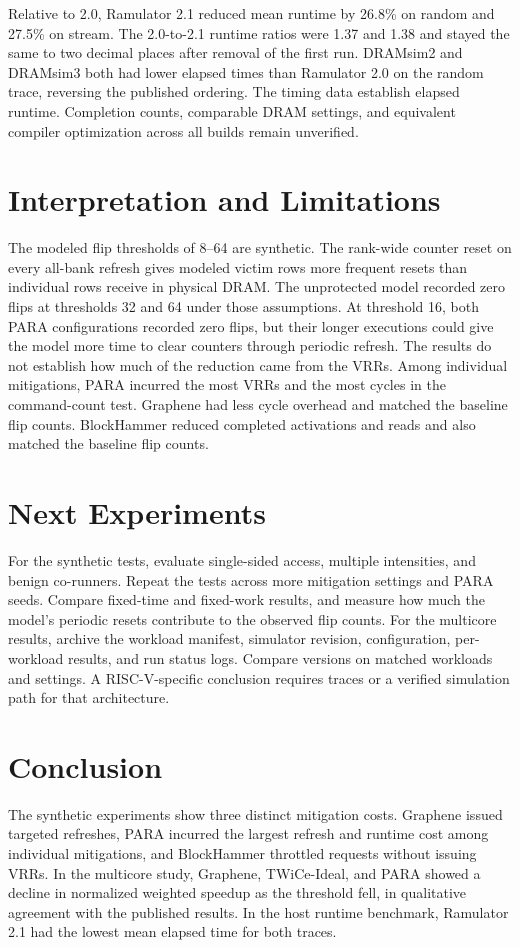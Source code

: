 \documentclass[11pt,letterpaper]{article}
\begin{document}
Relative to 2.0, Ramulator 2.1 reduced mean runtime by 26.8\% on random and 27.5\% on stream. The 2.0-to-2.1 runtime ratios were 1.37 and 1.38 and stayed the same to two decimal places after removal of the first run. DRAMsim2 and DRAMsim3 both had lower elapsed times than Ramulator 2.0 on the random trace, reversing the published ordering. The timing data establish elapsed runtime. Completion counts, comparable DRAM settings, and equivalent compiler optimization across all builds remain unverified.

\section{Interpretation and Limitations}
The modeled flip thresholds of 8--64 are synthetic. The rank-wide counter reset on every all-bank refresh gives modeled victim rows more frequent resets than individual rows receive in physical DRAM. The unprotected model recorded zero flips at thresholds 32 and 64 under those assumptions. At threshold 16, both PARA configurations recorded zero flips, but their longer executions could give the model more time to clear counters through periodic refresh. The results do not establish how much of the reduction came from the VRRs. Among individual mitigations, PARA incurred the most VRRs and the most cycles in the command-count test. Graphene had less cycle overhead and matched the baseline flip counts. BlockHammer reduced completed activations and reads and also matched the baseline flip counts.

\section{Next Experiments}
For the synthetic tests, evaluate single-sided access, multiple intensities, and benign co-runners. Repeat the tests across more mitigation settings and PARA seeds. Compare fixed-time and fixed-work results, and measure how much the model's periodic resets contribute to the observed flip counts. For the multicore results, archive the workload manifest, simulator revision, configuration, per-workload results, and run status logs. Compare versions on matched workloads and settings. A RISC-V-specific conclusion requires traces or a verified simulation path for that architecture.

\section{Conclusion}
The synthetic experiments show three distinct mitigation costs. Graphene issued targeted refreshes, PARA incurred the largest refresh and runtime cost among individual mitigations, and BlockHammer throttled requests without issuing VRRs. In the multicore study, Graphene, TWiCe-Ideal, and PARA showed a decline in normalized weighted speedup as the threshold fell, in qualitative agreement with the published results. In the host runtime benchmark, Ramulator 2.1 had the lowest mean elapsed time for both traces.
\end{document}
